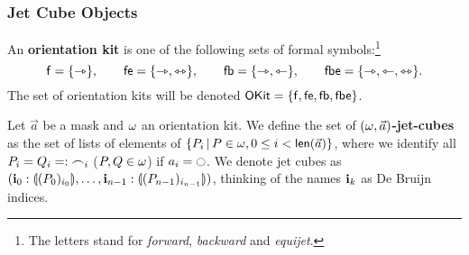 \documentclass[a4paper]{memoir}
\begin{document}
\subsubsection{Jet Cube Objects}
\begin{definition} \label{def:orientation-kit}
	An \textbf{orientation kit} is one of the following sets of formal symbols:\footnote{The letters stand for \emph{forward}, \emph{backward} and \emph{equijet}.}
	\[
		{\mathsf{f}} = \mathopen{}\left\{ {\rightarrowtriangle} \right\}\mathclose{}, \qquad
		{\mathsf{fe}} = \mathopen{}\left\{ {\rightarrowtriangle}, {\leftrightarrowtriangle} \right\}\mathclose{}, \qquad
		{\mathsf{fb}} = \mathopen{}\left\{ {\rightarrowtriangle}, {\leftarrowtriangle} \right\}\mathclose{}, \qquad
		{\mathsf{fbe}} = \mathopen{}\left\{ {\rightarrowtriangle}, {\leftarrowtriangle}, {\leftrightarrowtriangle} \right\}\mathclose{}.
	\]
	The set of orientation kits will be denoted ${\mathsf{OKit}} = \mathopen{}\left\{ {\mathsf{f}}, {\mathsf{fe}}, {\mathsf{fb}}, {\mathsf{fbe}} \right\}\mathclose{}$.
\end{definition}
\begin{definition} \label{def:jet-cube}
	Let $\vec a$ be a mask and $\omega$ an orientation kit.
	We define the set of \textbf{$(\omega, \vec{a})$-jet-cubes} as the set of lists of elements of $\mathopen{}\left\{ P_i \,\middle|\, P \in \omega, 0 \leq i < \mathsf{len}(\vec a) \right\}\mathclose{}$,
	where we identify all $P_i = Q_i =: {\frown}_i$ ($P, Q \in \omega$) if $a_i = \npolar$.
	We denote jet cubes as
	$(\mathbf{i}_0 : {\llparenthesis (P_0)_{i_0} \rrparenthesis}, \ldots, \mathbf{i}_{n-1} : {\llparenthesis (P_{n-1})_{i_{n-1}} \rrparenthesis})$,
	thinking of the names $\mathbf{i}_k$ as De Bruijn indices.
	
%	
%	
\end{definition}
\end{document}
